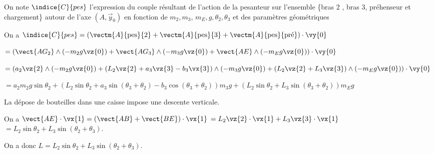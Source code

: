 
On note $\indice{C}{pes}$ l'expression du couple résultant de l'action de la pesanteur sur l'ensemble \{bras 2 , bras 3, préhenseur et chargement\} autour de l'axe $\left(A, \vec{y}_{0}\right)$ en fonction de $m_{2}, m_{3}$, $m_{E}, g, \theta_{2}, \theta_{3}$ et des paramètres géométriques
\fi




\ifprof
\begin{corrige}
On a $\indice{C}{pes} = \left( \vectm{A}{\text{pes}}{2}+\vectm{A}{\text{pes}}{3}+\vectm{A}{\text{pes}}{\text{pré}}\right)\cdot \vy{0}$

$ =\left( \vect{AG_2}\wedge \left(-m_2 g \vz{0}\right) + \vect{AG_3}\wedge \left(-m_3 g \vz{0}\right) +\vect{AE}\wedge \left(-m_E g \vz{0}\right)\right) \cdot \vy{0} $

$ =\left( a_2 \vz{2}\wedge \left(-m_2 g \vz{0}\right) + \left( L_2 \vz{2}+ a_3 \vz{3}- b_3 \vx{3} \right)\wedge \left(-m_3 g \vz{0}\right) + \left( L_2 \vz{2}+ L_3 \vz{3} \right)\wedge \left(-m_E g \vz{0}\right)\right) \cdot \vy{0} $

$ = a_2m_2g \sin\theta_2 +\left( L_2 \sin\theta_2 + a_3 \sin(\theta_3+\theta_2)- b_3 \cos(\theta_3+\theta_2) \right) m_3 g  + \left( L_2 \sin\theta_2+ L_3  \sin(\theta_3+\theta_2) \right) m_E g  $

\end{corrige}
\else
\fi

La dépose de bouteilles dans une caisse impose une descente verticale.%

\ifprof
\begin{corrige}
On a 
$\vect{AE}\cdot \vx{1} = \left(\vect{AB} + \vect{BE}\right) \cdot \vx{1}$
$= L_2 \vz{2}\cdot \vx{1} + L_3\vz{3}\cdot \vx{1}$ 
$= L_2 \sin \theta_2 + L_3\sin \left(\theta_2+\theta_3\right)$.

On a donc $L = L_2 \sin \theta_2 + L_3 \sin \left(\theta_2+\theta_3\right)$.

\end{corrige}
\else
\fi

